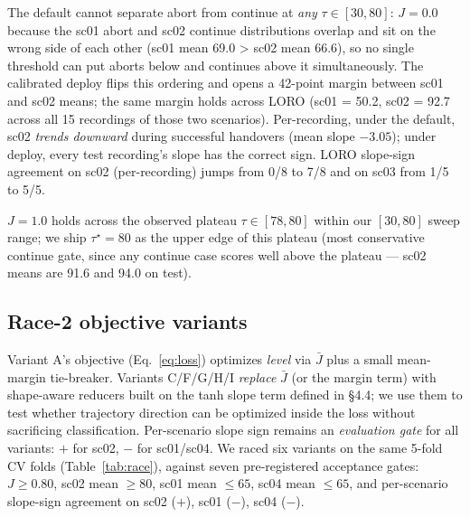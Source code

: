 \documentclass{article}
\begin{document}
The default cannot separate abort from continue at \emph{any} $\tau \in [30, 80]$: $J = 0.0$ because the sc01 abort and sc02 continue distributions overlap and sit on the wrong side of each other (sc01 mean 69.0 > sc02 mean 66.6), so no single threshold can put aborts below and continues above it simultaneously. The calibrated deploy flips this ordering and opens a 42-point margin between sc01 and sc02 means; the same margin holds across LORO (sc01 = 50.2, sc02 = 92.7 across all 15 recordings of those two scenarios). Per-recording, under the default, sc02 \emph{trends downward} during successful handovers (mean slope $-3.05$); under deploy, every test recording's slope has the correct sign. LORO slope-sign agreement on sc02 (per-recording) jumps from 0/8 to 7/8 and on sc03 from 1/5 to 5/5.

$J=1.0$ holds across the observed plateau $\tau \in [78, 80]$ within our $[30, 80]$ sweep range; we ship $\tau^\star = 80$ as the upper edge of this plateau (most conservative continue gate, since any continue case scores well above the plateau --- sc02 means are 91.6 and 94.0 on test).

\subsection{Race-2 objective variants}\label{sec:race}

Variant A's objective (Eq.~\ref{eq:loss}) optimizes \emph{level} via $\bar J$ plus a small mean-margin tie-breaker. Variants C/F/G/H/I \emph{replace} $\bar J$ (or the margin term) with shape-aware reducers built on the tanh slope term defined in \S4.4; we use them to test whether trajectory direction can be optimized inside the loss without sacrificing classification. Per-scenario slope sign remains an \emph{evaluation gate} for all variants: $+$ for sc02, $-$ for sc01/sc04. We raced six variants on the same 5-fold CV folds (Table~\ref{tab:race}), against seven pre-registered acceptance gates: $J \ge 0.80$, sc02 mean $\ge 80$, sc01 mean $\le 65$, sc04 mean $\le 65$, and per-scenario slope-sign agreement on sc02 ($+$), sc01 ($-$), sc04 ($-$).
\end{document}

